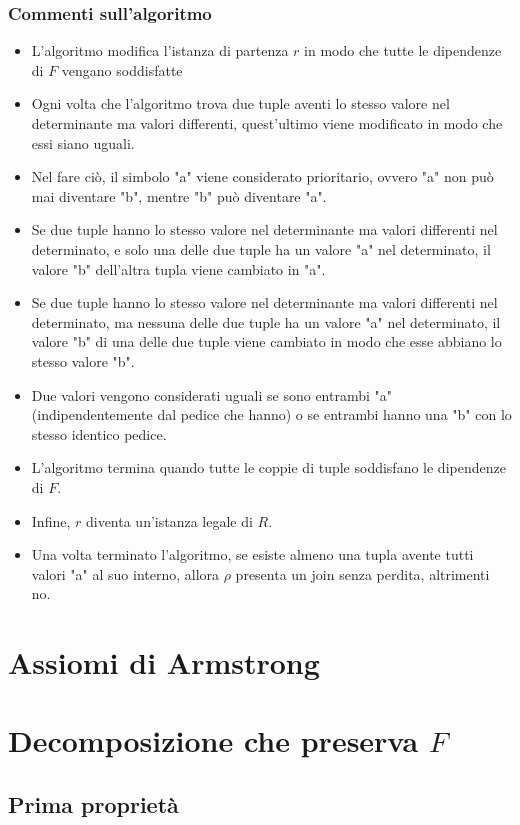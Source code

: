 \documentclass{article}
\begin{document}
\subsubsection{Commenti sull'algoritmo}
\begin{itemize}
    \item L'algoritmo modifica l'istanza di partenza $r$ in modo che tutte le dipendenze di $F$ vengano soddisfatte
    \item Ogni volta che l'algoritmo trova due tuple aventi lo stesso valore nel determinante ma valori differenti, quest'ultimo viene modificato in modo che essi siano uguali.
    \item Nel fare ciò, il simbolo "a" viene considerato prioritario, ovvero "a" non può mai diventare "b", mentre "b" può diventare "a".
    \item Se due tuple hanno lo stesso valore nel determinante ma valori differenti nel determinato, e solo una delle due tuple ha un valore "a" nel determinato, il valore "b" dell'altra tupla viene cambiato in "a".
    \item Se due tuple hanno lo stesso valore nel determinante ma valori differenti nel determinato, ma nessuna delle due tuple ha un valore "a" nel determinato, il valore "b" di una delle due tuple viene cambiato in modo che esse abbiano lo stesso valore "b".
    \item Due valori vengono considerati uguali se sono entrambi "a" (indipendentemente dal pedice che hanno) o se entrambi hanno una "b" con lo stesso identico pedice.
    \item L'algoritmo termina quando tutte le coppie di tuple soddisfano le dipendenze di $F$.
    \item Infine, $r$ diventa un'istanza legale di $R$.
    \item Una volta terminato l'algoritmo, se esiste almeno una tupla avente tutti valori "a" al suo interno, allora $\rho$ presenta un join senza perdita, altrimenti no.
\end{itemize}



\pagebreak
\section{Assiomi di Armstrong}
\pagebreak
\section{Decomposizione che preserva $F$}
\subsection{Prima proprietà}
\end{document}
